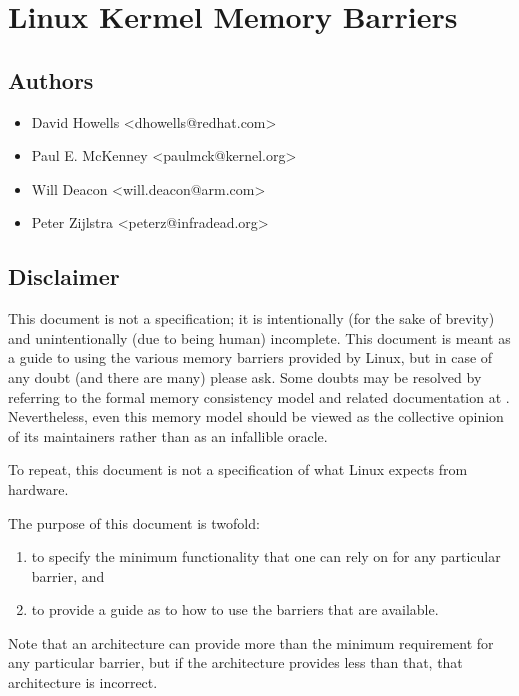 \chapter{Linux Kermel Memory Barriers}

\section{Authors}

\begin{itemize}[itemsep=0pt]
  \item David Howells <dhowells@redhat.com>
  \item Paul E. McKenney <paulmck@kernel.org>
  \item Will Deacon <will.deacon@arm.com>
  \item Peter Zijlstra <peterz@infradead.org>
\end{itemize}

\section{Disclaimer}

This document is not a specification; it is intentionally (for the sake of
brevity) and unintentionally (due to being human) incomplete.
This document is meant as a guide to using the various memory barriers
provided by Linux, but in case of any doubt (and there are many) please ask.
Some doubts may be resolved by referring to the formal memory consistency
model and related documentation at .
Nevertheless, even this memory model should be viewed as the collective
opinion of its maintainers rather than as an infallible oracle.

To repeat, this document is not a specification of what Linux expects from
hardware.

The purpose of this document is twofold:

\begin{enumerate}
  \item to specify the minimum functionality that one can rely on for any
        particular barrier, and
  \item to provide a guide as to how to use the barriers that are available.
\end{enumerate}

Note that an architecture can provide more than the minimum requirement
for any particular barrier, but if the architecture provides less than
that, that architecture is incorrect.

